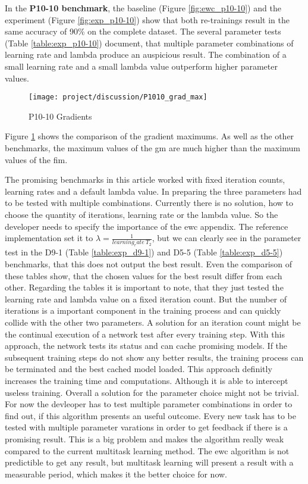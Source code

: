 In the \textbf{P10-10 benchmark}, the baseline (Figure \ref{fig:ewc_p10-10}) and the experiment (Figure \ref{fig:exp_p10-10}) show that both re-trainings result in the same accuracy of 90\% on the complete dataset.
\newline
The several parameter tests (Table \ref{table:exp_p10-10}) document, that multiple parameter combinations of learning rate and lambda produce an auspicious result.
The combination of a small learning rate and a small lambda value outperform higher parameter values.

\begin{figure}[H]
    \centering
    \texttt{[image: project/discussion/P1010\_grad\_max]}
    \caption{P10-10 Gradients}
    \label{fig:dis_d1010}
\end{figure}

Figure \ref{fig:dis_d1010} shows the comparison of the gradient maximums.
As well as the other benchmarks, the maximum values of the \acrshort{gm} are much higher than the maximum values of the \acrshort{fim}.

The promising benchmarks in this article worked with fixed iteration counts, learning rates and a default lambda value.
In preparing the three parameters had to be tested with multiple combinations.
Currently there is no solution, how to choose the quantity of iterations, learning rate or the lambda value.
So the developer needs to specify the importance of the \acrshort{ewc} appendix.
The reference implementation set it to $\lambda = \frac{1}{learning_rate \: T_2 }$, but we can clearly see in
the parameter test in the D9-1 (Table \ref{table:exp_d9-1}) and D5-5 (Table \ref{table:exp_d5-5}) benchmarks, that this does not output the best result.
Even the comparison of these tables show, that the chosen values for the best result differ from each other.
Regarding the tables it is important to note, that they just tested the learning rate and lambda value on a fixed iteration count.
But the number of iterations is a important component in the training process and can quickly collide with the other two parameters.
A solution for an iteration count might be the continual execution of a network test after every training step.
With this approach, the network tests its status and can cache promising models.
If the subsequent training steps do not show any better results, the training process can be terminated and the best cached model loaded.
This approach definitly increases the training time and computations.
Although it is able to intercept useless training.
Overall a solution for the parameter choice might not be trivial.
\newline
For now the devleoper has to test multiple parameter combinations in order to find out, if this algorithm presents an useful outcome.
Every new task has to be tested with multiple parameter varations in order to get feedback if there is a promising result.
This is a big problem and makes the algorithm really weak compared to the current multitask learning method.
The \acrshort{ewc} algorithm is not predictible to get any result, but multitask learning will present a result with a measurable period, which makes it the better choice for now.

